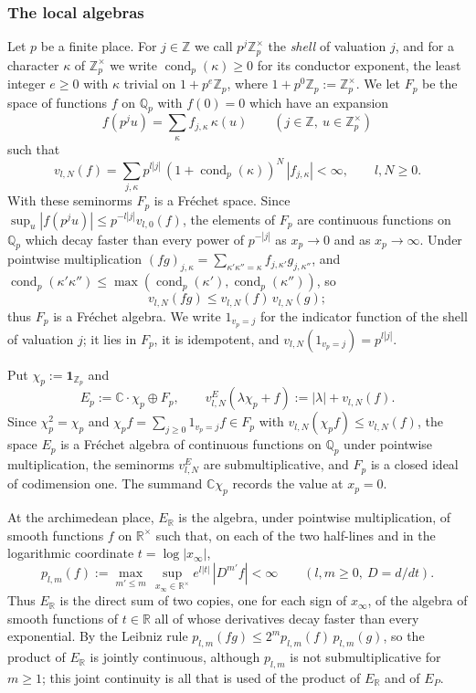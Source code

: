 \documentclass[11pt]{amsart}
\theoremstyle{definition}
\theoremstyle{remark}
\newcommand{\C}{\mathbb C}
\newcommand{\R}{\mathbb R}
\newcommand{\Z}{\mathbb Z}
\newcommand{\Q}{\mathbb Q}
\newcommand{\cond}{\operatorname{cond}}
\begin{document}
\subsubsection*{The local algebras}
Let $p$ be a finite place.  For $j\in\Z$ we call $p^{j}\Z_p^{\times}$ the
\emph{shell} of valuation $j$, and for a character $\kappa$ of
$\Z_p^{\times}$ we write $\cond_p(\kappa)\ge0$ for its conductor exponent, the
least integer $e\ge0$ with $\kappa$ trivial on $1+p^{e}\Z_p$, where
$1+p^{0}\Z_p:=\Z_p^{\times}$.  We let $F_p$ be the space of functions $f$ on $\Q_p$ with
$f(0)=0$ which have an expansion
\[
f(p^{j}u)=\sum_{\kappa}f_{j,\kappa}\,\kappa(u)\qquad(j\in\Z,\ u\in\Z_p^{\times})
\]
such that
\begin{equation}\label{eq:seminorms}
v_{l,N}(f)=\sum_{j,\kappa}p^{l|j|}\,(1+\cond_p(\kappa))^{N}\,|f_{j,\kappa}|<\infty ,
\qquad l,N\ge0 .
\end{equation}
With these seminorms $F_p$ is a Fr\'echet space.  Since
$\sup_{u}|f(p^{j}u)|\le p^{-l|j|}v_{l,0}(f)$, the elements of $F_p$ are
continuous functions on $\Q_p$ which decay faster than every power of
$p^{-|j|}$ as $x_p\to0$ and as $x_p\to\infty$.  Under pointwise multiplication
$(fg)_{j,\kappa}=\sum_{\kappa'\kappa''=\kappa}f_{j,\kappa'}g_{j,\kappa''}$, and
$\cond_p(\kappa'\kappa'')\le\max(\cond_p(\kappa'),\cond_p(\kappa''))$, so
\[
v_{l,N}(fg)\le v_{l,N}(f)\,v_{l,N}(g);
\]
thus $F_p$ is a Fr\'echet algebra.  We write $1_{v_p=j}$ for the indicator
function of the shell of valuation $j$; it lies in $F_p$, it is idempotent,
and $v_{l,N}(1_{v_p=j})=p^{l|j|}$.

Put $\chi_p:=\mathbf 1_{\Z_p}$ and
\[
E_p:=\C\cdot\chi_p\oplus F_p,\qquad
v^{E}_{l,N}(\lambda\chi_p+f):=|\lambda|+v_{l,N}(f).
\]
Since $\chi_p^{2}=\chi_p$ and $\chi_pf=\sum_{j\ge0}1_{v_p=j}f\in F_p$ with
$v_{l,N}(\chi_pf)\le v_{l,N}(f)$, the space $E_p$ is a Fr\'echet algebra of
continuous functions on $\Q_p$ under pointwise multiplication, the seminorms
$v^{E}_{l,N}$ are submultiplicative, and $F_p$ is a closed ideal of
codimension one.  The summand $\C\chi_p$ records the value at $x_p=0$.

At the archimedean place, $E_{\R}$ is the algebra, under pointwise
multiplication, of smooth functions $f$ on $\R^{\times}$ such that, on each of
the two half-lines and in the logarithmic coordinate $t=\log|x_{\infty}|$,
\[
p_{l,m}(f):=\max_{m'\le m}\,\sup_{x_{\infty}\in\R^{\times}}e^{l|t|}\,|D^{m'}f|<\infty
\qquad(l,m\ge0,\ D=d/dt).
\]
Thus $E_{\R}$ is the direct sum of two copies, one for each sign of
$x_{\infty}$, of the algebra of smooth functions of $t\in\R$ all of whose
derivatives decay faster than every exponential.  By the Leibniz rule
$p_{l,m}(fg)\le2^{m}p_{l,m}(f)\,p_{l,m}(g)$, so the product of $E_{\R}$ is jointly
continuous, although $p_{l,m}$ is not submultiplicative for $m\ge1$; this joint
continuity is all that is used of the product of $E_{\R}$ and of $E_P$.
\end{document}
